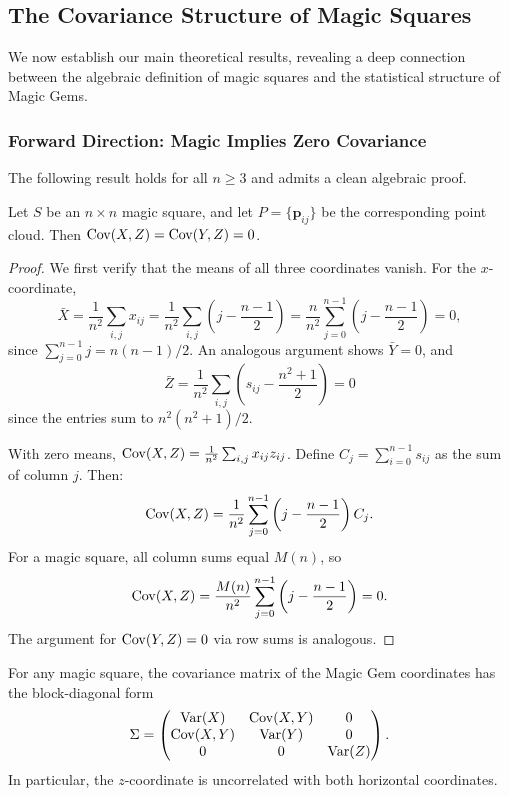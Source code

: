 \subsection{The Covariance Structure of Magic Squares}
\label{sec:zero_cov_theorem}

We now establish our main theoretical results, revealing a deep connection 
between the algebraic definition of magic squares and the statistical structure of Magic Gems.

\subsubsection{Forward Direction: Magic Implies Zero Covariance}

The following result holds for all $n \geq 3$ and admits a clean algebraic proof.

\begin{proposition}
\label{prop:magic_implies_zero_cov}
Let $S$ be an $n \times n$ magic square, and let $P = \{\mathbf{p}_{ij}\}$ be the corresponding point cloud. 
Then $\mathrm{Cov}(X, Z) = \mathrm{Cov}(Y, Z) = 0$.
\end{proposition}

\begin{proof}
We first verify that the means of all three coordinates vanish.
For the $x$-coordinate,
\[
\bar{X} = \frac{1}{n^2} \sum_{i,j} x_{ij} = \frac{1}{n^2} \sum_{i,j} \left( j - \frac{n-1}{2} \right) 
= \frac{n}{n^2} \sum_{j=0}^{n-1} \left( j - \frac{n-1}{2} \right) = 0,
\]
since $\sum_{j=0}^{n-1} j = n(n-1)/2$. An analogous argument shows $\bar{Y} = 0$, and 
\[
\bar{Z} = \frac{1}{n^2} \sum_{i,j} \left( s_{ij} - \frac{n^2+1}{2} \right) = 0
\]
since the entries sum to $n^2(n^2+1)/2$.

With zero means, $\mathrm{Cov}(X, Z) = \frac{1}{n^2} \sum_{i,j} x_{ij} z_{ij}$.
Define $C_j = \sum_{i=0}^{n-1} s_{ij}$ as the sum of column $j$. Then:
\[
\mathrm{Cov}(X, Z) = \frac{1}{n^2} \sum_{j=0}^{n-1} \left( j - \frac{n-1}{2} \right) C_j.
\]
For a magic square, all column sums equal $M(n)$, so
\[
\mathrm{Cov}(X, Z) = \frac{M(n)}{n^2} \sum_{j=0}^{n-1} \left( j - \frac{n-1}{2} \right) = 0.
\]
The argument for $\mathrm{Cov}(Y, Z) = 0$ via row sums is analogous.
\end{proof}

\begin{corollary}
For any magic square, the covariance matrix of the Magic Gem coordinates has the block-diagonal form
\[
\Sigma = \begin{pmatrix}
\mathrm{Var}(X) & \mathrm{Cov}(X,Y) & 0 \\
\mathrm{Cov}(X,Y) & \mathrm{Var}(Y) & 0 \\
0 & 0 & \mathrm{Var}(Z)
\end{pmatrix}.
\]
In particular, the $z$-coordinate is uncorrelated with both horizontal coordinates.
\end{corollary}

